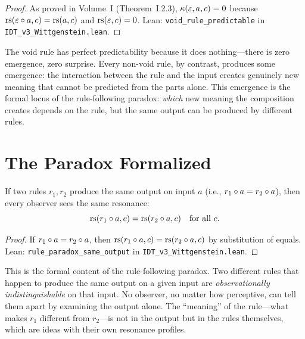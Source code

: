 \begin{proof}
As proved in Volume~I (Theorem~I.2.3), $\kappa(\varepsilon, a, c) = 0$ because
$\mathrm{rs}(\varepsilon \circ a, c) = \mathrm{rs}(a, c)$ and $\mathrm{rs}(\varepsilon, c) = 0$.
Lean: \texttt{void\_rule\_predictable} in \texttt{IDT\_v3\_Wittgenstein.lean}.
\end{proof}

\begin{interpretation}
The void rule has perfect predictability because it does nothing---there is
zero emergence, zero surprise. Every non-void rule, by contrast, produces
some emergence: the interaction between the rule and the input creates
genuinely new meaning that cannot be predicted from the parts alone. This
emergence is the formal locus of the rule-following paradox: \emph{which}
new meaning the composition creates depends on the rule, but the same
output can be produced by different rules.
\end{interpretation}

\section{The Paradox Formalized}

\begin{theorem}
\label{thm:rule-paradox}
If two rules $r_1, r_2$ produce the same output on input $a$
(i.e., $r_1 \circ a = r_2 \circ a$), then every observer sees the
same resonance:
\[
\mathrm{rs}(r_1 \circ a, c) = \mathrm{rs}(r_2 \circ a, c) \quad \text{for all } c.
\]
\end{theorem}

\begin{proof}
If $r_1 \circ a = r_2 \circ a$, then $\mathrm{rs}(r_1 \circ a, c)
= \mathrm{rs}(r_2 \circ a, c)$ by substitution of equals.
Lean: \texttt{rule\_paradox\_same\_output} in \texttt{IDT\_v3\_Wittgenstein.lean}.
\end{proof}

\begin{interpretation}
This is the formal content of the rule-following paradox. Two different rules
that happen to produce the same output on a given input are \emph{observationally
indistinguishable} on that input. No observer, no matter how perceptive, can
tell them apart by examining the output alone. The ``meaning'' of the rule---what
makes $r_1$ different from $r_2$---is not in the output but in the rules
themselves, which are ideas with their own resonance profiles.
\end{interpretation}

